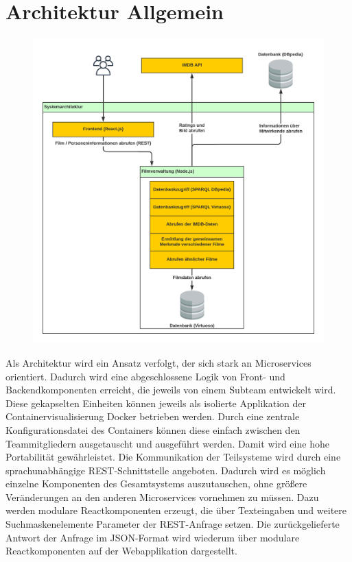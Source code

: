 \documentclass[conference]{IEEEtran}
\begin{document}
\section{Architektur Allgemein}
\begin{figure}
    \centering
    \includegraphics[width=\textwidth]{UebersichtGesamtsystem.png}
    \caption{}
\end{figure}

Als Architektur wird ein Ansatz verfolgt, der sich stark an Microservices orientiert.
Dadurch wird eine abgeschlossene Logik von Front- und Backendkomponenten erreicht, die jeweils
von einem Subteam entwickelt wird. Diese gekapselten Einheiten können jeweils als isolierte Applikation der Containervisualisierung
Docker betrieben werden. Durch eine zentrale Konfigurationsdatei des Containers können diese einfach zwischen den Teammitgliedern
ausgetauscht und ausgeführt werden. Damit wird eine hohe Portabilität gewährleistet.
Die Kommunikation der Teilsysteme wird durch eine sprachunabhängige REST-Schnittstelle angeboten. 
Dadurch wird es möglich einzelne Komponenten des Gesamtsystems auszutauschen, ohne größere Veränderungen an den anderen 
Microservices vornehmen zu müssen.
Dazu werden modulare Reactkomponenten erzeugt, die über Texteingaben und weitere Suchmaskenelemente Parameter der REST-Anfrage setzen.
Die zurückgelieferte Antwort der Anfrage im JSON-Format wird wiederum über modulare Reactkomponenten auf der Webapplikation dargestellt.\cite{microservices}
\end{document}
